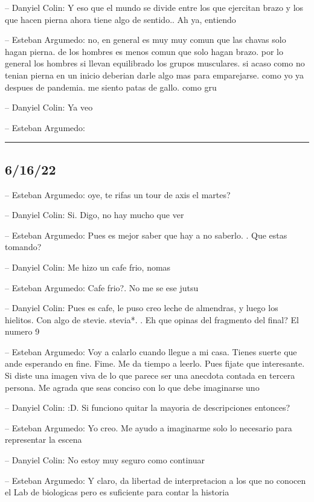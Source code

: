 -- Danyiel Colin: Y eso que el mundo se divide entre los que ejercitan
brazo y los que hacen pierna ahora tiene algo de sentido.. Ah ya,
entiendo

-- Esteban Argumedo: no, en general es muy muy comun que las chavas solo
hagan pierna. de los hombres es menos comun que solo hagan brazo. por lo
general los hombres si llevan equilibrado los grupos musculares. si
acaso como no tenian pierna en un inicio deberian darle algo mas para
emparejarse. como yo ya despues de pandemia. me siento patas de gallo.
como gru

-- Danyiel Colin: Ya veo

-- Esteban Argumedo:

\begin{center}\rule{0.5\linewidth}{0.5pt}\end{center}

\hypertarget{section-103}{%
\subsection{6/16/22}\label{section-103}}

-- Esteban Argumedo: oye, te rifas un tour de axis el martes?

-- Danyiel Colin: Si. Digo, no hay mucho que ver

-- Esteban Argumedo: Pues es mejor saber que hay a no saberlo. . Que
estas tomando?

-- Danyiel Colin: Me hizo un cafe frio, nomas

-- Esteban Argumedo: Cafe frio?. No me se ese jutsu

-- Danyiel Colin: Pues es cafe, le puso creo leche de almendras, y luego
los hielitos. Con algo de stevie. stevia*. . Eh que opinas del fragmento
del final? El numero 9

-- Esteban Argumedo: Voy a calarlo cuando llegue a mi casa. Tienes
suerte que ande esperando en fine. Fime. Me da tiempo a leerlo. Pues
fijate que interesante. Si diste una imagen viva de lo que parece ser
una anecdota contada en tercera persona. Me agrada que seas conciso con
lo que debe imaginarse uno

-- Danyiel Colin: :D. Si funciono quitar la mayoria de descripciones
entonces?

-- Esteban Argumedo: Yo creo. Me ayudo a imaginarme solo lo necesario
para representar la escena

-- Danyiel Colin: No estoy muy seguro como continuar

-- Esteban Argumedo: Y claro, da libertad de interpretacion a los que no
conocen el Lab de biologicas pero es suficiente para contar la historia

